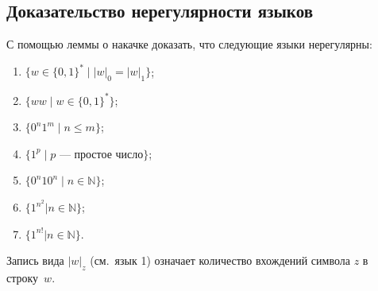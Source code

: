 \subsection*{Доказательство нерегулярности языков}

С помощью леммы о накачке доказать, что следующие языки нерегулярны:
\begin{multicols}{2}
\begin{enumerate}
  \item $\{ w \in \{0, 1\}^* \mid
  |w|_0 = |w|_1\}$;
  \item $\{w w \mid w \in \{0, 1\}^\ast \}$;
  \item $\{0^n1^m \mid n \leqslant m \}$;
  \item $\{1^p \mid \text{$p$ — простое число} \}$;
  \item $\{0^n10^n \mid n \in \mathbb N\}$;
  \item $\{1^{n^2} | n \in \mathbb N\}$;
  \item $\{1^{n!} | n \in \mathbb N\}$.
\end{enumerate}
\end{multicols}
\noindent Запись вида $|w|_z$  (см.~язык 1) означает количество вхождений символа $z$ в строку~$w$.

